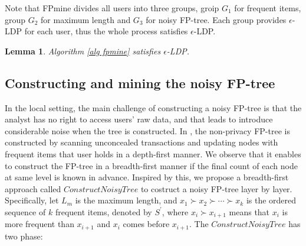 \documentclass[conference]{IEEEtran}
\newtheorem{lemma}{Lemma}[section]
\newtheorem*{proof}{\text{$Proof.$}}
\begin{document}
Note that FPmine divides all users into three groups, groip $G_1$ for frequent items, group $G_2$ for maximum length and $G_3$ for noisy FP-tree. Each group provides $\epsilon$-LDP for each user, thus the whole process satisfies $\epsilon$-LDP.

\begin{lemma}
Algorithm \ref{alg fpmine} satisfies $\epsilon$-LDP.
\end{lemma}


\subsection{Constructing and mining the noisy FP-tree}
\label{construct and mine}
In the local setting, the main challenge of constructing a noisy FP-tree is that the analyst has no right to access users' raw data, and that leads to introduce considerable noise when the tree is constructed. In \cite{fp}, the non-privacy FP-tree is constructed by scanning unconcealed transactions and {\color{red}updating nodes with frequent items that user holds in a depth-first manner}. We observe that it enables to construct the FP-tree in a breadth-first manner if the final count of each node at same level is known in advance. Inspired by this, we propose a breadth-first approach {\color{red}called $ConstructNoisyTree$} to costruct a noisy FP-tree layer by layer. Specifically, let $L_m$ is the maximum length, and $x_1 \succ x_2 \succ \cdots  \succ x_k$ is the ordered sequence of $k$ frequent items, denoted by $S^{\prime}$, where $x_i \succ x_{i+1}$ means that $x_i$ is more frequent than $x_{i+1}$ and $x_i$ comes before $x_{i+1}$. The {\color{red} $ConstructNoisyTree$} has two phase:

\end{document}
